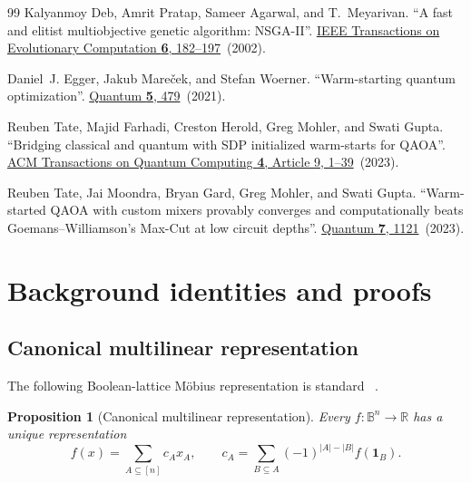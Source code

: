 \documentclass[a4paper,onecolumn,11pt,unpublished]{quantumarticle}
\newtheorem{proposition}[proposition]{Proposition}
\theoremstyle{remark}
\begin{document}
\begin{thebibliography}{99}
Kalyanmoy Deb, Amrit Pratap, Sameer Agarwal, and T.~Meyarivan.
\newblock ``A fast and elitist multiobjective genetic algorithm: NSGA-II''.
\newblock \href{https://dx.doi.org/10.1109/4235.996017}{IEEE Transactions on Evolutionary Computation {\bf 6}, 182--197}~(2002).

Daniel~J. Egger, Jakub Mare{\v c}ek, and Stefan Woerner.
\newblock ``Warm-starting quantum optimization''.
\newblock \href{https://dx.doi.org/10.22331/q-2021-06-17-479}{Quantum {\bf 5}, 479}~(2021).

Reuben Tate, Majid Farhadi, Creston Herold, Greg Mohler, and Swati Gupta.
\newblock ``Bridging classical and quantum with SDP initialized warm-starts for QAOA''.
\newblock \href{https://dx.doi.org/10.1145/3549554}{ACM Transactions on Quantum Computing {\bf 4}, Article 9, 1--39}~(2023).

Reuben Tate, Jai Moondra, Bryan Gard, Greg Mohler, and Swati Gupta.
\newblock ``Warm-started QAOA with custom mixers provably converges and computationally beats Goemans--Williamson's Max-Cut at low circuit depths''.
\newblock \href{https://dx.doi.org/10.22331/q-2023-09-26-1121}{Quantum {\bf 7}, 1121}~(2023).

\end{thebibliography}


\clearpage
\appendix
\section{Background identities and proofs}
\label{app:background-identities}

\subsection{Canonical multilinear representation}
\label{app:canonical-pb}

The following Boolean-lattice M\"obius representation is standard
~\cite{BorosHammer2002,Hadfield2021}.
\begin{proposition}[Canonical multilinear representation]
Every \(f:\mathbb{B}^n\to\mathbb{R}\) has a unique representation
\begin{equation}
  f(x)=\sum_{A\subseteq[n]}c_Ax_A,
  \qquad
  c_A=\sum_{B\subseteq A}(-1)^{|A|-|B|}f(\mathbf{1}_B).
  \label{eq:app-mobius}
\end{equation}
\end{proposition}
\end{document}
